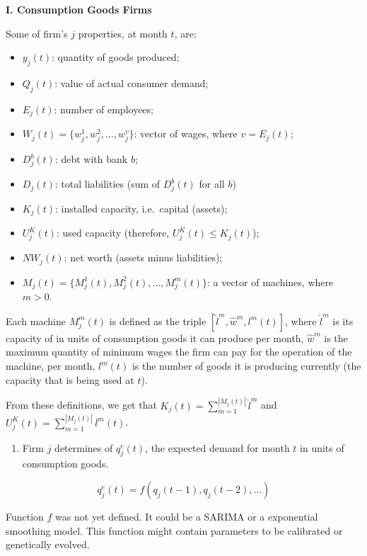 \documentclass[11pt,]{article}
\providecommand{\tightlist}{%
\setlength{\itemsep}{0pt}\setlength{\parskip}{0pt}}
\begin{document}
\textbf{I. Consumption Goods Firms}

Some of firm's \(j\) properties, at month \(t\), are:

\begin{itemize}
\tightlist
\item
  \(y_j(t)\): quantity of goods produced;
\item
  \(Q_j(t)\): value of actual consumer demand;
\item
  \(E_j(t)\): number of employees;
\item
  \(W_j(t) = \{w_j^1, w_j^2, ... , w_j^v\}\): vector of wages, where
  \(v = E_j(t)\);
\item
  \(D_j^b(t)\): debt with bank \(b\);
\item
  \(D_j(t)\): total liabilities (sum of \(D_j^b(t)\) for all \(b\))
\item
  \(K_j(t)\): installed capacity, i.e.~capital (assets);
\item
  \(U^K_j(t)\): used capacity (therefore, \(U^K_j(t) \leq K_j(t)\));
\item
  \(NW_j(t)\): net worth (assets minus liabilities);
\item
  \(M_j(t) = \{M_j^1(t), M_j^2(t), ... , M_j^m(t)\}\): a vector of
  machines, where \(m > 0\).
\end{itemize}

Each machine \(M_j^m(t)\) is defined as the triple
\([\hat{l}^m, \hat{w}^m, l^m(t)]\), where \(\hat{l}^m\) is its capacity
of in units of consumption goods it can produce per month, \(\hat{w}^m\)
is the maximum quantity of minimum wages the firm can pay for the
operation of the machine, per month, \(l^m(t)\) is the number of goods
it is producing currently (the capacity that is being used at \(t\)).

From these definitions, we get that
\(K_j(t) = \sum_{m = 1}^{|M_j(t)|} \hat{l}^m\) and
\(U_j^K(t) = \sum_{m = 1}^{|M_j(t)|} l^m(t)\).

\begin{enumerate}
\def\labelenumi{\alph{enumi}.}
\tightlist
\item
  Firm \(j\) determines of \(q_j^e(t)\), the expected demand for month
  \(t\) in units of consumption goods.
\end{enumerate}

\begin{equation}
q_j^e(t) = f(q_j(t-1), q_j(t-2),\text{...})
\end{equation}

Function \(f\) was not yet defined. It could be a SARIMA or a
exponential smoothing model. This function might contain parameters to
be calibrated or genetically evolved.
\end{document}
